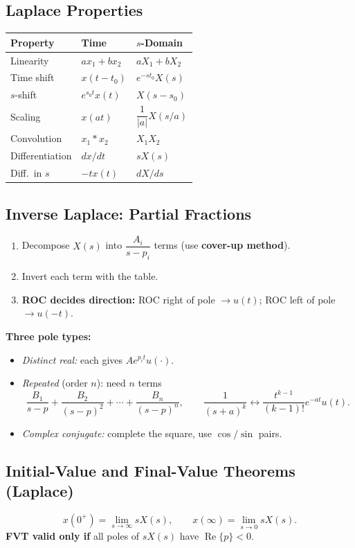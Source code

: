 \documentclass[11pt]{article}
\begin{document}
\subsection{Laplace Properties}
\begin{center}
\begin{tabular}{lll}
\toprule
Property & Time & $s$-Domain \\
\midrule
Linearity & $ax_1 + bx_2$ & $aX_1 + bX_2$ \\
Time shift & $x(t - t_0)$ & $e^{-s t_0} X(s)$ \\
$s$-shift & $e^{s_0 t} x(t)$ & $X(s - s_0)$ \\
Scaling & $x(at)$ & $\dfrac{1}{|a|} X(s/a)$ \\
Convolution & $x_1 * x_2$ & $X_1 X_2$ \\
Differentiation & $dx/dt$ & $sX(s)$ \\
Diff.\ in $s$ & $-tx(t)$ & $dX/ds$ \\
\bottomrule
\end{tabular}
\end{center}

\subsection{Inverse Laplace: Partial Fractions}
\begin{enumerate}
  \item Decompose $X(s)$ into $\dfrac{A_i}{s - p_i}$ terms (use \textbf{cover-up method}).
  \item Invert each term with the table.
  \item \textbf{ROC decides direction:} ROC right of pole $\to u(t)$; ROC left of pole $\to u(-t)$.
\end{enumerate}

\textbf{Three pole types:}
\begin{itemize}
  \item \emph{Distinct real:} each gives $A e^{p_i t} u(\cdot)$.
  \item \emph{Repeated} (order $n$): need $n$ terms
  \[ \frac{B_1}{s-p} + \frac{B_2}{(s-p)^2} + \cdots + \frac{B_n}{(s-p)^n}, \qquad \frac{1}{(s+a)^k} \leftrightarrow \frac{t^{k-1}}{(k-1)!}e^{-at}u(t). \]
  \item \emph{Complex conjugate:} complete the square, use $\cos / \sin$ pairs.
\end{itemize}

\subsection{Initial-Value and Final-Value Theorems (Laplace)}
\[ x(0^+) = \lim_{s \to \infty} sX(s), \qquad x(\infty) = \lim_{s \to 0} sX(s). \]
\textbf{FVT valid only if} all poles of $sX(s)$ have $\operatorname{Re}\{p\} < 0$.
\end{document}
